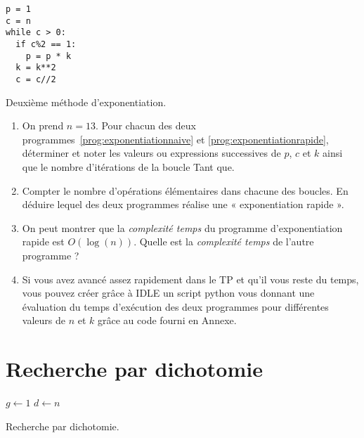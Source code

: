 \begin{listing}[!h]
\begin{verbatim}
p = 1
c = n
while c > 0:
  if c%2 == 1:
    p = p * k
  k = k**2  
  c = c//2
\end{verbatim}
\caption{Deuxième méthode d'exponentiation.}
\label{prog:exponentiationrapide}
\end{listing}

\begin{enumerate}

\item On prend $n=13$. Pour chacun des deux programmes~\ref{prog:exponentiationnaive} et \ref{prog:exponentiationrapide}, déterminer et noter les valeurs ou expressions successives de $p$, $c$ et $k$ ainsi que le nombre d'itérations de la boucle Tant que.  

\item Compter le nombre d'opérations élémentaires dans chacune des boucles. En déduire lequel des deux programmes réalise une « exponentiation rapide ». 

\item On peut montrer que la \textit{complexité temps} du programme d'exponentiation rapide est $O(\log(n))$. Quelle est la \textit{complexité temps} de l'autre programme ?

\item Si vous avez avancé assez rapidement dans le TP et qu'il vous reste du temps, vous pouvez créer grâce à IDLE un script python vous donnant une évaluation du temps d'exécution des deux programmes pour différentes valeurs de $n$ et $k$ grâce au code fourni en Annexe.

\end{enumerate}

\section{Recherche par dichotomie}

\begin{algorithm}[H]
$g \leftarrow 1$ \;
$d \leftarrow n$ \;
\caption{Recherche par dichotomie.}
\label{algo:recherchetantquedicho}
\end{algorithm}

